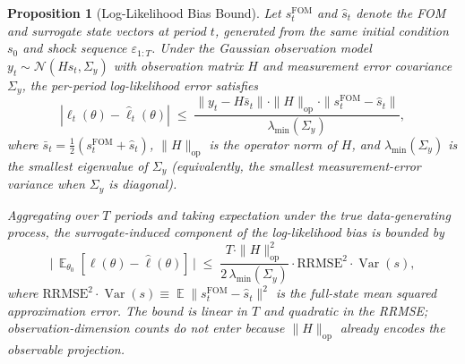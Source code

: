 \documentclass[12pt]{article}
\theoremstyle{plain}
\newtheorem{proposition}[theorem]{Proposition}
\theoremstyle{definition}
\theoremstyle{remark}
\DeclareMathOperator{\E}{\mathbb{E}}
\DeclareMathOperator{\Var}{\text{Var}}
\newcommand{\eps}{\varepsilon}
\newcommand{\Sigmay}{\Sigma_y}
\begin{document}
\begin{proposition}[Log-Likelihood Bias Bound]
\label{prop:ll_bias_bound}
Let $s_t^{\text{FOM}}$ and $\hat{s}_t$ denote the FOM and surrogate state vectors at period $t$, generated from the same initial condition $s_0$ and shock sequence $\eps_{1:T}$. Under the Gaussian observation model $y_t \sim \mathcal{N}(Hs_t, \Sigmay)$ with observation matrix $H$ and measurement error covariance $\Sigmay$, the per-period log-likelihood error satisfies
\begin{equation}
|\ell_t(\theta) - \hat{\ell}_t(\theta)|
  \;\leq\; \frac{\|y_t - H\bar{s}_t\| \cdot \|H\|_{\text{op}} \cdot
    \|s_t^{\text{FOM}} - \hat{s}_t\|}{\lambda_{\min}(\Sigmay)},
\label{eq:ll_bias_exact}
\end{equation}
where $\bar{s}_t = \tfrac{1}{2}(s_t^{\text{FOM}} + \hat{s}_t)$, $\|H\|_{\text{op}}$ is the operator norm of $H$, and $\lambda_{\min}(\Sigmay)$ is the smallest eigenvalue of $\Sigmay$ (equivalently, the smallest measurement-error variance when $\Sigmay$ is diagonal).

Aggregating over $T$ periods and taking expectation under the true data-generating process, the surrogate-induced component of the log-likelihood bias is bounded by
\begin{equation}
\bigl|\,\E_{\theta_0}[\ell(\theta) - \hat{\ell}(\theta)]\,\bigr|
  \;\leq\; \frac{T \cdot \|H\|_{\text{op}}^2}{2\,\lambda_{\min}(\Sigmay)}
    \cdot \text{RRMSE}^2 \cdot \Var(s),
\label{eq:ll_bias_total}
\end{equation}
where $\text{RRMSE}^2 \cdot \Var(s) \equiv \E\|s_t^{\text{FOM}} - \hat{s}_t\|^2$ is the full-state mean squared approximation error. The bound is linear in $T$ and quadratic in the RRMSE; observation-dimension counts do not enter because $\|H\|_{\text{op}}$ already encodes the observable projection.
\end{proposition}
\end{document}
